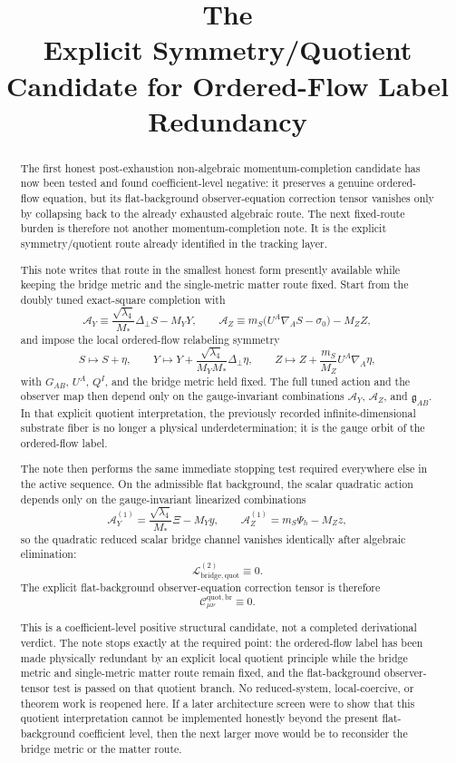\documentclass[11pt]{article}
\title{\textbf{The \TheoryName{}}\\[0.4em]
\large Explicit Symmetry/Quotient Candidate for Ordered-Flow Label Redundancy}
\author{}
\date{}
\newcommand{\BridgeMetric}{\mathfrak{g}}
\newcommand{\AY}{\mathcal A_Y}
\newcommand{\AZ}{\mathcal A_Z}
\begin{document}
\maketitle

\begin{abstract}
The first honest post-exhaustion non-algebraic momentum-completion candidate has now been tested and found coefficient-level negative: it preserves a genuine ordered-flow equation, but its flat-background observer-equation correction tensor vanishes only by collapsing back to the already exhausted algebraic route. The next fixed-route burden is therefore not another momentum-completion note. It is the explicit symmetry/quotient route already identified in the tracking layer.

This note writes that route in the smallest honest form presently available while keeping the bridge metric and the single-metric matter route fixed. Start from the doubly tuned exact-square completion with
\[
\AY
\equiv
\frac{\sqrt{\lambda_4}}{M_*}\Delta_\perp S-M_YY,
\qquad
\AZ
\equiv
m_S\bigl(U^A\nabla_A S-\sigma_0\bigr)-M_ZZ,
\]
and impose the local ordered-flow relabeling symmetry
\[
S\mapsto S+\eta,
\qquad
Y\mapsto Y+\frac{\sqrt{\lambda_4}}{M_YM_*}\Delta_\perp\eta,
\qquad
Z\mapsto Z+\frac{m_S}{M_Z}U^A\nabla_A\eta,
\]
with \(G_{AB}\), \(U^A\), \(Q^I\), and the bridge metric held fixed. The full tuned action and the observer map then depend only on the gauge-invariant combinations \(\AY\), \(\AZ\), and \(\BridgeMetric_{AB}\). In that explicit quotient interpretation, the previously recorded infinite-dimensional substrate fiber is no longer a physical underdetermination; it is the gauge orbit of the ordered-flow label.

The note then performs the same immediate stopping test required everywhere else in the active sequence. On the admissible flat background, the scalar quadratic action depends only on the gauge-invariant linearized combinations
\[
\AY^{(1)}
=
\frac{\sqrt{\lambda_4}}{M_*}\Xi-M_Yy,
\qquad
\AZ^{(1)}
=
m_S\Psi_h-M_Zz,
\]
so the quadratic reduced scalar bridge channel vanishes identically after algebraic elimination:
\[
\mathcal L_{\mathrm{bridge,quot}}^{(2)}\equiv 0.
\]
The explicit flat-background observer-equation correction tensor is therefore
\[
\mathcal C_{\mu\nu}^{\mathrm{quot,br}}\equiv 0.
\]

This is a coefficient-level positive structural candidate, not a completed derivational verdict. The note stops exactly at the required point: the ordered-flow label has been made physically redundant by an explicit local quotient principle while the bridge metric and single-metric matter route remain fixed, and the flat-background observer-tensor test is passed on that quotient branch. No reduced-system, local-coercive, or theorem work is reopened here. If a later architecture screen were to show that this quotient interpretation cannot be implemented honestly beyond the present flat-background coefficient level, then the next larger move would be to reconsider the bridge metric or the matter route.
\end{abstract}
\end{document}
